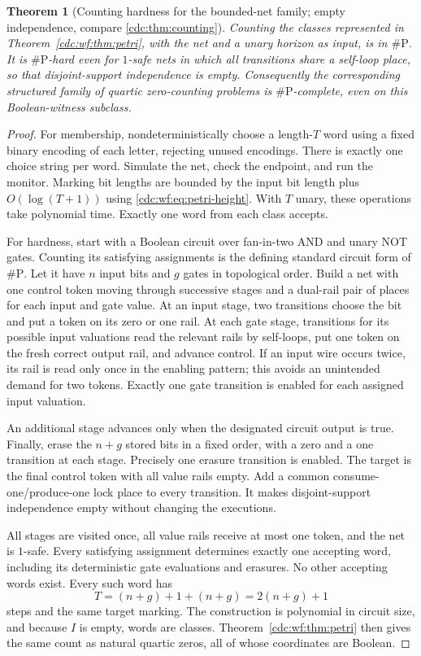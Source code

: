 \documentclass[11pt,a4paper]{article}
\newtheorem{theorem}{Theorem}[section]
\theoremstyle{definition}
\theoremstyle{remark}
\begin{document}
\begin{theorem}[Counting hardness for the bounded-net family; empty independence, compare \cref{cdc:thm:counting}]\label{cdc:wf:thm:counting}
Counting the classes represented in Theorem~\ref{cdc:wf:thm:petri}, with the net and a unary horizon as input, is in $\#\mathrm P$. It is $\#\mathrm P$-hard even for $1$-safe nets in which all transitions share a self-loop place, so that disjoint-support independence is empty. Consequently the corresponding structured family of quartic zero-counting problems is $\#\mathrm P$-complete, even on this Boolean-witness subclass.
\end{theorem}
\begin{proof}
For membership, nondeterministically choose a length-$T$ word using a fixed binary encoding of each letter, rejecting unused encodings. There is exactly one choice string per word. Simulate the net, check the endpoint, and run the monitor. Marking bit lengths are bounded by the input bit length plus $O(\log(T+1))$ using \eqref{cdc:wf:eq:petri-height}. With $T$ unary, these operations take polynomial time. Exactly one word from each class accepts.

For hardness, start with a Boolean circuit over fan-in-two AND and unary NOT gates. Counting its satisfying assignments is the defining standard circuit form of $\#\mathrm P$. Let it have $n$ input bits and $g$ gates in topological order. Build a net with one control token moving through successive stages and a dual-rail pair of places for each input and gate value. At an input stage, two transitions choose the bit and put a token on its zero or one rail. At each gate stage, transitions for its possible input valuations read the relevant rails by self-loops, put one token on the fresh correct output rail, and advance control. If an input wire occurs twice, its rail is read only once in the enabling pattern; this avoids an unintended demand for two tokens. Exactly one gate transition is enabled for each assigned input valuation.

An additional stage advances only when the designated circuit output is true. Finally, erase the $n+g$ stored bits in a fixed order, with a zero and a one transition at each stage. Precisely one erasure transition is enabled. The target is the final control token with all value rails empty. Add a common consume-one/produce-one lock place to every transition. It makes disjoint-support independence empty without changing the executions.

All stages are visited once, all value rails receive at most one token, and the net is $1$-safe. Every satisfying assignment determines exactly one accepting word, including its deterministic gate evaluations and erasures. No other accepting words exist. Every such word has
\[
 T=(n+g)+1+(n+g)=2(n+g)+1
\]
steps and the same target marking. The construction is polynomial in circuit size, and because $I$ is empty, words are classes. Theorem~\ref{cdc:wf:thm:petri} then gives the same count as natural quartic zeros, all of whose coordinates are Boolean.
\end{proof}
\end{document}
